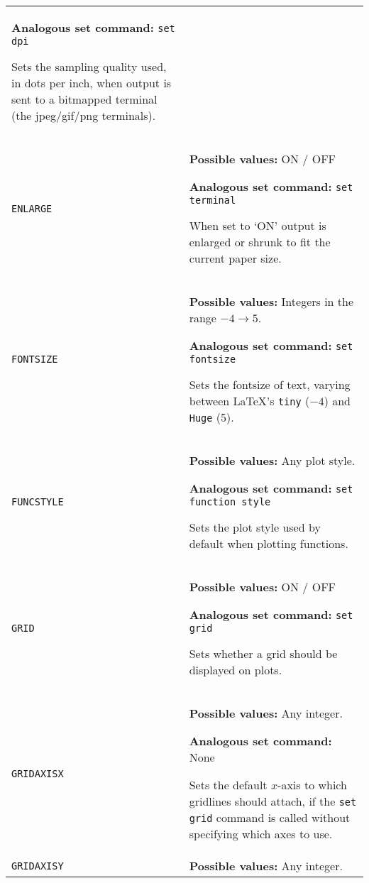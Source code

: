\begin{longtable}{p{3.4cm}p{9cm}}
                   \textbf{Analogous set command:} \texttt{set dpi}\index{set dpi command@\texttt{set dpi} command}

                   Sets the sampling quality used, in dots per inch, when output is sent to a bitmapped terminal (the jpeg/gif/png terminals).
                   \\
\texttt{ENLARGE} & \textbf{Possible values:} ON / OFF

                   \textbf{Analogous set command:} \texttt{set terminal}\index{set terminal command@\texttt{set terminal} command}
                   
                   When set to `ON' output is enlarged or shrunk to fit the
                   current paper size.
                   \\

\texttt{FONTSIZE} & \textbf{Possible values:} Integers in the range $-4 \to 5$.

                   \textbf{Analogous set command:} \texttt{set fontsize}\index{set fontsize command@\texttt{set fontsize} command}

                   Sets the fontsize of text, varying between \LaTeX's \texttt{tiny} ($-4$) and \texttt{Huge} (5).
                   \\
\texttt{FUNCSTYLE} & \textbf{Possible values:} Any plot style.

                   \textbf{Analogous set command:} \texttt{set function style}\index{set function style command@\texttt{set function style} command}

                   Sets the plot style used by default when plotting functions.
                   \\
\texttt{GRID} & \textbf{Possible values:} ON / OFF

                   \textbf{Analogous set command:} \texttt{set grid}\index{set grid command@\texttt{set grid} command}

                   Sets whether a grid should be displayed on plots.
                   \\
\texttt{GRIDAXISX} & \textbf{Possible values:} Any integer.

                   \textbf{Analogous set command:} None

                   Sets the default $x$-axis to which gridlines should attach, if the \texttt{set grid} command is called without specifying which axes to use.
                   \\
\texttt{GRIDAXISY} & \textbf{Possible values:} Any integer.


\end{longtable}
